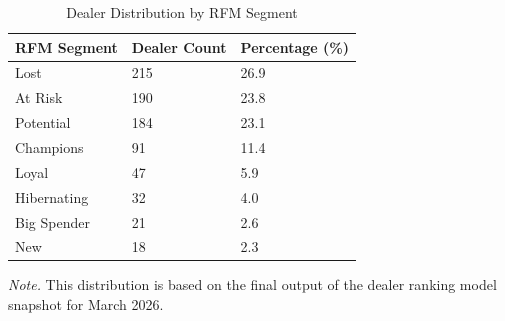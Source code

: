 \begin{table}[htbp]
\centering
\caption{Dealer Distribution by RFM Segment}
\label{tab:dealer_rfm}
\begin{tabular}{lll}
\toprule
\textbf{RFM Segment} & \textbf{Dealer Count} & \textbf{Percentage (\%)} \\
\midrule
Lost & 215 & 26.9 \\
At Risk & 190 & 23.8 \\
Potential & 184 & 23.1 \\
Champions & 91 & 11.4 \\
Loyal & 47 & 5.9 \\
Hibernating & 32 & 4.0 \\
Big Spender & 21 & 2.6 \\
New & 18 & 2.3 \\
\bottomrule
\end{tabular}
\begin{flushleft}
\footnotesize \textit{Note.} This distribution is based on the final output of the dealer ranking model snapshot for March 2026.
\end{flushleft}
\end{table}
